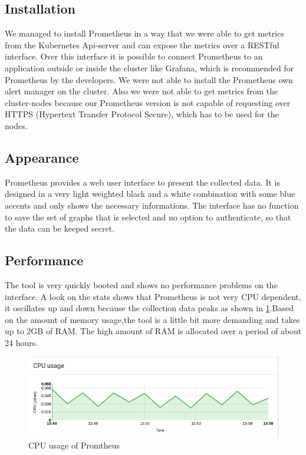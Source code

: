 \subsection{Installation}
We managed to install Prometheus in a way that we were able to get metrics from the  Kubernetes Api-server and can expose the metrics over a RESTful interface. Over this interface it is possible to connect Prometheus to an application outside or inside the cluster like Grafana, which is recommended for Prometheus by the developers. We were not able to install the Prometheus own alert manager on the cluster. Also we were not able to get metrics from the cluster-nodes because our Prometheus version is not capable of requesting over HTTPS (Hypertext Transfer Protocol Secure), which has to be used for the nodes. 
\subsection{Appearance}%
Prometheus provides a web user interface to present the collected data. It is designed in a very light weighted black and a white combination with some blue accents and only shows the necessary informations. The interface has no function to save the set of graphs that is selected and no option to authenticate, so that the data can be keeped secret. 
\subsection{Performance}
The tool is very quickly booted and shows no performance problems on the interface. A look on the stats shows that Prometheus is not very CPU dependent, it oscillates up and down because the collection data peaks as shown in \cref{fig:Prometeus_Cpu}.Based on the amount of memory usage,the tool is a little bit more demanding and takes up to 2GB of RAM. The high amount of RAM is allocated over a period of about 24 hours. 
\begin{figure}
\centering
\includegraphics[width=1\linewidth]{Bilder/Performance/Prometeus_Cpu}
\caption{CPU usage of Promtheus}
\label{fig:Prometeus_Cpu}
\end{figure}
